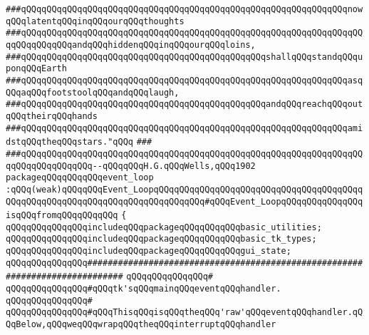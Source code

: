 \verb|###qQQqqQQqqQQqqQQqqQQqqQQqqQQqqQQqqQQqqQQqqQQqqQQqqQQqqQQqqQQqqQQqnowqQQqlatentqQQqinqQQqourqQQqthoughts|\newline
\verb|###qQQqqQQqqQQqqQQqqQQqqQQqqQQqqQQqqQQqqQQqqQQqqQQqqQQqqQQqqQQqqQQqqQQqqQQqqQQqqQQqandqQQqhiddenqQQqinqQQqourqQQqloins,|\newline
\verb|###qQQqqQQqqQQqqQQqqQQqqQQqqQQqqQQqqQQqqQQqqQQqqQQqshallqQQqstandqQQquponqQQqEarth|\newline
\verb|###qQQqqQQqqQQqqQQqqQQqqQQqqQQqqQQqqQQqqQQqqQQqqQQqqQQqqQQqqQQqqQQqasqQQqaqQQqfootstoolqQQqandqQQqlaugh,|\newline
\verb|###qQQqqQQqqQQqqQQqqQQqqQQqqQQqqQQqqQQqqQQqqQQqqQQqandqQQqreachqQQqoutqQQqtheirqQQqhands|\newline
\verb|###qQQqqQQqqQQqqQQqqQQqqQQqqQQqqQQqqQQqqQQqqQQqqQQqqQQqqQQqqQQqqQQqamidstqQQqtheqQQqstars."qQQq|\newline
\verb|###|\newline
\verb|###qQQqqQQqqQQqqQQqqQQqqQQqqQQqqQQqqQQqqQQqqQQqqQQqqQQqqQQqqQQqqQQqqQQqqQQqqQQqqQQqqQQq--qQQqqQQqH.G.qQQqWells,qQQq1902|\newline
\newline
\newline
\newline
\verb|packageqQQqqQQqqQQqevent_loop|\newline
\verb|:qQQq(weak)qQQqqQQqEvent_LoopqQQqqQQqqQQqqQQqqQQqqQQqqQQqqQQqqQQqqQQqqQQqqQQqqQQqqQQqqQQqqQQqqQQqqQQqqQQqqQQq#qQQqEvent_LoopqQQqqQQqqQQqqQQqisqQQqfromqQQqqQQqqQQq|\newline
\verb|{|\newline
\verb|qQQqqQQqqQQqqQQqincludeqQQqpackageqQQqqQQqqQQqbasic_utilities;|\newline
\verb|qQQqqQQqqQQqqQQqincludeqQQqpackageqQQqqQQqqQQqbasic_tk_types;|\newline
\verb|qQQqqQQqqQQqqQQqincludeqQQqpackageqQQqqQQqqQQqgui_state;|\newline
\newline
\verb|qQQqqQQqqQQqqQQq#############################################################################|\newline
\verb|qQQqqQQqqQQqqQQq#|\newline
\verb|qQQqqQQqqQQqqQQq#qQQqtk'sqQQqmainqQQqeventqQQqhandler.|\newline
\verb|qQQqqQQqqQQqqQQq#|\newline
\verb|qQQqqQQqqQQqqQQq#qQQqThisqQQqisqQQqtheqQQq'raw'qQQqeventqQQqhandler.qQQqBelow,qQQqweqQQqwrapqQQqtheqQQqinterruptqQQqhandler|\newline
